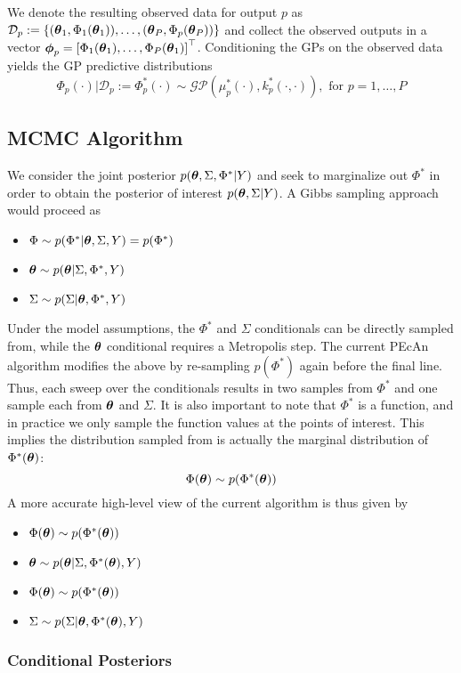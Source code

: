 \documentclass[12pt]{article}
\begin{document}
We denote the resulting observed data for output $p$ as 
$\mathcal{D}_p := \left\{(\boldsymbol{\theta}_1, \Phi_1(\boldsymbol{\theta}_1)), \dots, (\boldsymbol{\theta}_P, \Phi_p(\boldsymbol{\theta}_P))  \right\}$ and collect the observed outputs in a vector 
$\boldsymbol{\phi}_p = \left[\Phi_1(\boldsymbol{\theta}_1), \dots, \Phi_P(\boldsymbol{\theta}_1) \right]^{\top}$. Conditioning the GPs on the observed data yields the GP predictive distributions 
\[\Phi_p(\cdot)|\mathcal{D}_p := \Phi_p^*(\cdot) \sim \mathcal{GP}(\mu^*_p(\cdot), k_p^*(\cdot, \cdot)), \text{ for } p = 1, \dots, P\]

\subsection{MCMC Algorithm}
We consider the joint posterior $p(\boldsymbol{\theta}, \Sigma, \Phi^*|Y)$ and seek to marginalize out $\Phi^*$ in order to obtain the posterior of interest $p(\boldsymbol{\theta}, \Sigma|Y)$. A Gibbs sampling approach would proceed as 
\begin{itemize}
\item $\Phi \sim p(\Phi^*|\boldsymbol{\theta}, \Sigma, Y) = p(\Phi^*)$
\item $\boldsymbol{\theta} \sim p(\boldsymbol{\theta}|\Sigma, \Phi^*, Y)$
\item $\Sigma \sim p(\Sigma|\boldsymbol{\theta}, \Phi^*, Y)$
\end{itemize}
Under the model assumptions, the $\Phi^*$ and $\Sigma$ conditionals can be directly sampled from, while the $\boldsymbol{\theta}$ conditional requires a Metropolis step. The current PEcAn algorithm modifies the above by re-sampling 
$p(\Phi^*)$ again before the final line. Thus, each sweep over the conditionals results in two samples from $\Phi^*$ and one sample each from $\boldsymbol{\theta}$ and $\Sigma$. It is also important to note that 
$\Phi^*$ is a function, and in practice we only sample the function values at the points of interest. This implies the distribution sampled from is actually the marginal distribution of $\Phi^*(\boldsymbol{\theta})$:
\[\Phi(\boldsymbol{\theta}) \sim p(\Phi^*(\boldsymbol{\theta}))\]
A more accurate high-level view of the current algorithm is thus given by 
\begin{itemize}
\item $\Phi(\boldsymbol{\theta}) \sim p(\Phi^*(\boldsymbol{\theta}))$
\item $\boldsymbol{\theta} \sim p(\boldsymbol{\theta}|\Sigma, \Phi^*(\boldsymbol{\theta}), Y)$
\item $\Phi(\boldsymbol{\theta}) \sim p(\Phi^*(\boldsymbol{\theta}))$
\item $\Sigma \sim p(\Sigma|\boldsymbol{\theta}, \Phi^*(\boldsymbol{\theta}), Y)$
\end{itemize}

\subsubsection{Conditional Posteriors}
\end{document}
